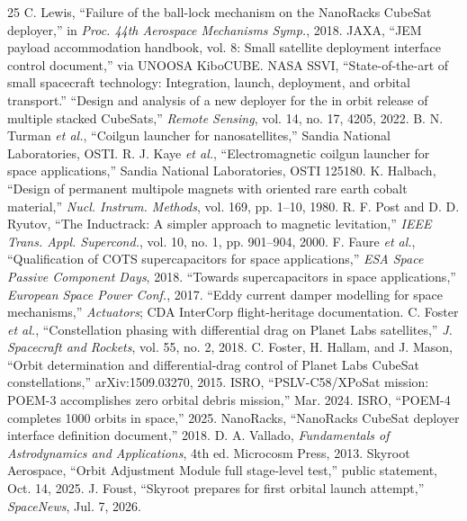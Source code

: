 \documentclass[conference]{IEEEtran}
\begin{document}
\begin{thebibliography}{25}
 C. Lewis, ``Failure of the ball-lock mechanism on the NanoRacks CubeSat deployer,'' in \emph{Proc. 44th Aerospace Mechanisms Symp.}, 2018.
 JAXA, ``JEM payload accommodation handbook, vol. 8: Small satellite deployment interface control document,'' via UNOOSA KiboCUBE.
 NASA SSVI, ``State-of-the-art of small spacecraft technology: Integration, launch, deployment, and orbital transport.''
 ``Design and analysis of a new deployer for the in orbit release of multiple stacked CubeSats,'' \emph{Remote Sensing}, vol. 14, no. 17, 4205, 2022.
 B. N. Turman \emph{et al.}, ``Coilgun launcher for nanosatellites,'' Sandia National Laboratories, OSTI.
 R. J. Kaye \emph{et al.}, ``Electromagnetic coilgun launcher for space applications,'' Sandia National Laboratories, OSTI 125180.
 K. Halbach, ``Design of permanent multipole magnets with oriented rare earth cobalt material,'' \emph{Nucl. Instrum. Methods}, vol. 169, pp. 1--10, 1980.
 R. F. Post and D. D. Ryutov, ``The Inductrack: A simpler approach to magnetic levitation,'' \emph{IEEE Trans. Appl. Supercond.}, vol. 10, no. 1, pp. 901--904, 2000.
 F. Faure \emph{et al.}, ``Qualification of COTS supercapacitors for space applications,'' \emph{ESA Space Passive Component Days}, 2018.
 ``Towards supercapacitors in space applications,'' \emph{European Space Power Conf.}, 2017.
 ``Eddy current damper modelling for space mechanisms,'' \emph{Actuators}; CDA InterCorp flight-heritage documentation.
 C. Foster \emph{et al.}, ``Constellation phasing with differential drag on Planet Labs satellites,'' \emph{J. Spacecraft and Rockets}, vol. 55, no. 2, 2018.
 C. Foster, H. Hallam, and J. Mason, ``Orbit determination and differential-drag control of Planet Labs CubeSat constellations,'' arXiv:1509.03270, 2015.
 ISRO, ``PSLV-C58/XPoSat mission: POEM-3 accomplishes zero orbital debris mission,'' Mar. 2024.
 ISRO, ``POEM-4 completes 1000 orbits in space,'' 2025.
 NanoRacks, ``NanoRacks CubeSat deployer interface definition document,'' 2018.
 D. A. Vallado, \emph{Fundamentals of Astrodynamics and Applications}, 4th ed. Microcosm Press, 2013.
 Skyroot Aerospace, ``Orbit Adjustment Module full stage-level test,'' public statement, Oct. 14, 2025.
 J. Foust, ``Skyroot prepares for first orbital launch attempt,'' \emph{SpaceNews}, Jul. 7, 2026.

\end{thebibliography}
\end{document}
